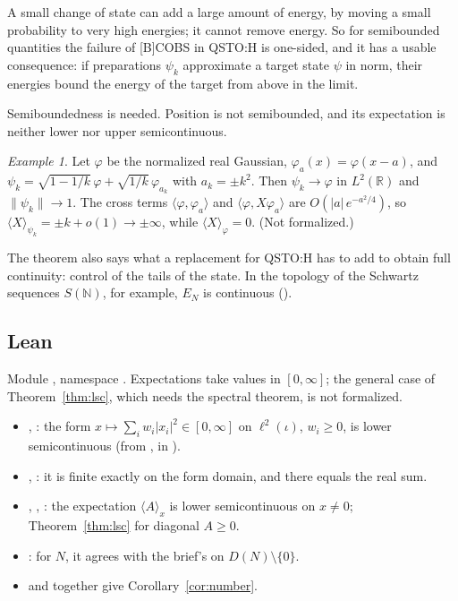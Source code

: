 \documentclass[11pt]{article}
\theoremstyle{remark}
\newtheorem{example}[theorem]{Example}
\newcommand{\ip}[2]{\langle #1, #2\rangle}
\begin{document}
A small change of state can add a large amount of energy, by moving a small probability to very
high energies; it cannot remove energy. So for semibounded quantities the failure of [B]COBS in
QSTO:H is one-sided, and it has a usable consequence: if preparations $\psi_k$ approximate a
target state $\psi$ in norm, their energies bound the energy of the target from above in the
limit.

Semiboundedness is needed. Position is not semibounded, and its expectation is neither lower nor
upper semicontinuous.

\begin{example}
  Let $\varphi$ be the normalized real Gaussian, $\varphi_a(x) = \varphi(x-a)$, and
  $\psi_k = \sqrt{1-1/k}\,\varphi + \sqrt{1/k}\,\varphi_{a_k}$ with $a_k = \pm k^2$. Then
  $\psi_k \to \varphi$ in $L^2(\mathbb R)$ and $\|\psi_k\| \to 1$. The cross terms
  $\ip{\varphi}{\varphi_a}$ and $\ip{\varphi}{X\varphi_a}$ are $O(|a|\,e^{-a^2/4})$, so
  $\langle X\rangle_{\psi_k} = \pm k + o(1) \to \pm\infty$, while $\langle X\rangle_\varphi = 0$.
  (Not formalized.)
\end{example}

The theorem also says what a replacement for QSTO:H has to add to obtain full continuity:
control of the tails of the state. In the topology of the Schwartz sequences $S(\mathbb N)$, for
example, $E_N$ is continuous
().

\subsection{Lean}

Module , namespace
. Expectations take values in $[0,\infty]$; the
general case of Theorem~\ref{thm:lsc}, which needs the spectral theorem, is not formalized.

\begin{itemize}
  \item {}, : the form
    $x \mapsto \sum_i w_i |x_i|^2 \in [0,\infty]$ on $\ell^2(\iota)$, $w_i \ge 0$, is lower
    semicontinuous (from , in
    ).
  \item {}, : it is finite exactly on the form
    domain, and there equals the real sum.
  \item {}, ,
    : the expectation $\langle A\rangle_x$ is lower
    semicontinuous on $x \ne 0$; Theorem~\ref{thm:lsc} for diagonal $A \ge 0$.
  \item {}: for $N$, it agrees with the brief's
     on $D(N)\setminus\{0\}$.
  \item {} and
     together give
    Corollary~\ref{cor:number}.
\end{itemize}
\end{document}
